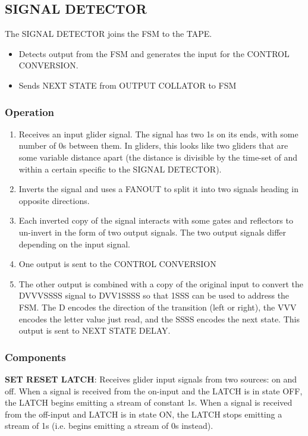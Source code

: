 \documentclass{article}
\begin{document}
\subsection{SIGNAL DETECTOR}


The SIGNAL DETECTOR joins the FSM to the TAPE.
\begin{itemize}
\item Detects output from the FSM and generates the input for the CONTROL CONVERSION.


\item Sends NEXT STATE from OUTPUT COLLATOR to FSM

\end{itemize}

\subsubsection{Operation}

\begin{enumerate}
\item Receives an input glider signal. The signal has two 1s on its ends, with some number of 0s between them. In gliders, this looks like two gliders that are some variable distance apart (the distance is divisible by the time-set of and within a certain specific to the SIGNAL DETECTOR).


\item Inverts the signal and uses a FANOUT to split it into two signals heading in opposite directions.


\item Each inverted copy of the signal interacts with some gates and reflectors to un-invert in the form of two output signals. The two output signals differ depending on the input signal.


\item One output is sent to the CONTROL CONVERSION


\item The other output is combined with a copy of the original input to convert the DVVVSSSS signal to DVV1SSSS so that 1SSS can be used to address the FSM. The D encodes the direction of the transition (left or right), the VVV encodes the letter value just read, and the SSSS encodes the next state. This output is sent to NEXT STATE DELAY.

\end{enumerate}

\subsubsection{Components}
\noindent\textbf{SET RESET LATCH}: Receives glider input signals from two sources: on and off. When a signal is received from the on-input and the LATCH is in state OFF, the LATCH begins emitting a stream of constant 1s. When a signal is received from the off-input and LATCH is in state ON, the LATCH stops emitting a stream of 1s (i.e. begins emitting a stream of 0s instead).
\end{document}
